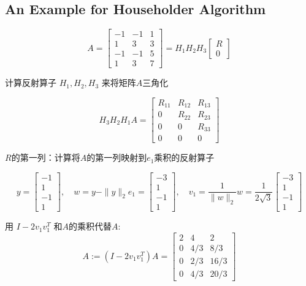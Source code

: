 \subsection{An Example for Householder Algorithm}

\begin{problem}
    $$ A=\left[\begin{array}{rrr}-1 & -1 & 1 \\ 1 & 3 & 3 \\ -1 & -1 & 5 \\ 1 & 3 & 7\end{array}\right]=H_{1} H_{2} H_{3}\left[\begin{array}{l}R \\ 0\end{array}\right] $$

    计算反射算子 $ H_{1}, H_{2}, H_{3} $ 来将矩阵$A$三角化

    $$ H_{3} H_{2} H_{1} A=\left[\begin{array}{ccc}R_{11} & R_{12} & R_{13} \\ 0 & R_{22} & R_{23} \\ 0 & 0 & R_{33} \\ 0 & 0 & 0\end{array}\right] $$

    $R$的第一列：计算将$A$的第一列映射到$e_1$乘积的反射算子

    $$
y=\left[\begin{array}{r}
-1 \\
1 \\
-1 \\
1
\end{array}\right], \quad w=y-\|y\|_{2} e_{1}=\left[\begin{array}{r}
-3 \\
1 \\
-1 \\
1
\end{array}\right], \quad v_{1}=\frac{1}{\|w\|_{2}} w=\frac{1}{2 \sqrt{3}}\left[\begin{array}{r}
-3 \\
1 \\
-1 \\
1
\end{array}\right]
$$

用 $I-2 v_{1} v_{1}^{T}$ 和$A$的乘积代替$A$:
$$
A:=\left(I-2 v_{1} v_{1}^{T}\right) A=\left[\begin{array}{ccc}
2 & 4 & 2 \\
0 & 4 / 3 & 8 / 3 \\
0 & 2 / 3 & 16 / 3 \\
0 & 4 / 3 & 20 / 3
\end{array}\right]
$$


\end{problem}
